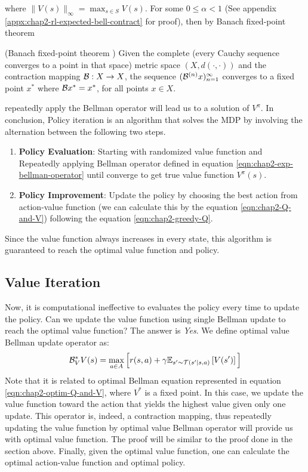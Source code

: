 where $\|V(s)\|_\infty = \max_{s \in S} V(s)$. For some $0 \le \alpha < 1$ (See appendix \ref{appx:chap2-rl-expected-bell-contract} for proof), then by Banach fixed-point theorem
\begin{theorem}{(Banach fixed-point theorem \cite{murfet_2019})}
    Given the complete (every Cauchy sequence converges to a point in that space) metric space $(X, d(\cdot, \cdot))$ and the contraction mapping $\mathcal{B} : X \rightarrow X$, the sequence $(\mathcal{B}^{(n)} x)^{\infty}_{n=1}$ converges to a fixed point $x^*$ where $\mathcal{B} x^* = x^*$, for all points $x \in X$. 
\end{theorem}
repeatedly apply the Bellman operator will lead us to a solution of $V^{\pi}$.  In conclusion, Policy iteration is an algorithm that solves the MDP by involving the alternation between the following two steps.
\begin{enumerate}
    \item \textbf{Policy Evaluation}: Starting with randomized value function and Repeatedly applying Bellman operator defined in equation \ref{eqn:chap2-exp-bellman-operator} until converge to get true value function $V^{\pi}(s)$.
    \item \textbf{Policy Improvement}: Update the policy by choosing the best action from action-value function (we can calculate this by the equation \ref{eqn:chap2-Q-and-V}) following the equation \ref{eqn:chap2-greedy-Q}.
\end{enumerate}
Since the value function always increases in every state, this algorithm is guaranteed to reach the optimal value function and policy. 

\subsection{Value Iteration}
\label{sec:chap2-value-iter}
Now, it is computational ineffective to evaluates the policy every time to update the policy. Can we update the value function using single Bellman update to reach the optimal value function? The answer is \textit{Yes}. We define optimal value Bellman update operator as:
\begin{equation}
    \label{eqn:chap2-optimal-bellman-operator}
    \mathcal{B}^*_V V(s) = \max_{a \in A}\Big[r(s, a) + \gamma \mathbb{E}_{s' \sim \mathcal{T}(s' | s, a)}\left[ V(s') \right] \Big]
\end{equation}
Note that it is related to optimal Bellman equation represented in equation \ref{eqn:chap2-optim-Q-and-V}, where $V^*$ is a fixed point. In this case, we update the value function toward the action that yields the highest value given only one update. This operator is, indeed, a contraction mapping, thus repeatedly updating the value function by optimal value Bellman operator will provide us with optimal value function. The proof will be similar to the proof done in the section above. Finally, given the optimal value function, one can calculate the optimal action-value function and optimal policy. 

